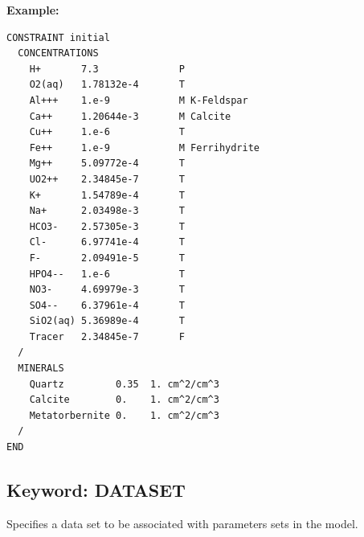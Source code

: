\documentclass[12pt]{article}
\begin{document}
\begin{mdframed}

\noindent
{\bf Example:}
\begin{verbatim}
CONSTRAINT initial
  CONCENTRATIONS
    H+       7.3              P
    O2(aq)   1.78132e-4       T
    Al+++    1.e-9            M K-Feldspar
    Ca++     1.20644e-3       M Calcite
    Cu++     1.e-6            T
    Fe++     1.e-9            M Ferrihydrite
    Mg++     5.09772e-4       T
    UO2++    2.34845e-7       T
    K+       1.54789e-4       T
    Na+      2.03498e-3       T
    HCO3-    2.57305e-3       T
    Cl-      6.97741e-4       T
    F-       2.09491e-5       T
    HPO4--   1.e-6            T
    NO3-     4.69979e-3       T
    SO4--    6.37961e-4       T
    SiO2(aq) 5.36989e-4       T
    Tracer   2.34845e-7       F
  /
  MINERALS
    Quartz         0.35  1. cm^2/cm^3
    Calcite        0.    1. cm^2/cm^3
    Metatorbernite 0.    1. cm^2/cm^3
  /
END
\end{verbatim}

\end{mdframed}


\hyperlink{target_key}{\return}


\newpage
\protect\hypertarget{target_datset}{}

\subsection{Keyword: DATASET}

Specifies a data set to be associated with parameters sets in the model.



\end{document}
